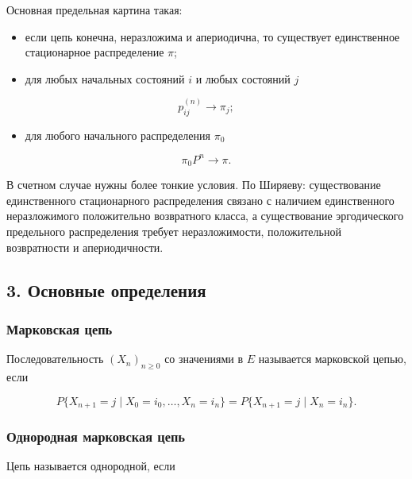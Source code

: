 \documentclass[
  11pt,
  a4paper,
]{article}
\providecommand{\tightlist}{%
  \setlength{\itemsep}{0pt}\setlength{\parskip}{0pt}}
\begin{document}
Основная предельная картина такая:

\begin{itemize}
\tightlist
\item
  если цепь конечна, неразложима и апериодична, то существует
  единственное стационарное распределение \(\pi\);
\item
  для любых начальных состояний \(i\) и любых состояний \(j\)
\end{itemize}

\[
p_{ij}^{(n)}\to\pi_j;
\]

\begin{itemize}
\tightlist
\item
  для любого начального распределения \(\pi_0\)
\end{itemize}

\[
\pi_0P^n\to\pi.
\]

В счетном случае нужны более тонкие условия. По Ширяеву: существование
единственного стационарного распределения связано с наличием
единственного неразложимого положительно возвратного класса, а
существование эргодического предельного распределения требует
неразложимости, положительной возвратности и апериодичности.

\subsection{3. Основные
определения}\label{ux43eux441ux43dux43eux432ux43dux44bux435-ux43eux43fux440ux435ux434ux435ux43bux435ux43dux438ux44f}

\subsubsection{Марковская
цепь}\label{ux43cux430ux440ux43aux43eux432ux441ux43aux430ux44f-ux446ux435ux43fux44c}

Последовательность \((X_n)_{n\ge0}\) со значениями в \(E\) называется
марковской цепью, если

\[
P\{X_{n+1}=j\mid X_0=i_0,\ldots,X_n=i_n\}
=
P\{X_{n+1}=j\mid X_n=i_n\}.
\]

\subsubsection{Однородная марковская
цепь}\label{ux43eux434ux43dux43eux440ux43eux434ux43dux430ux44f-ux43cux430ux440ux43aux43eux432ux441ux43aux430ux44f-ux446ux435ux43fux44c}

Цепь называется однородной, если
\end{document}
